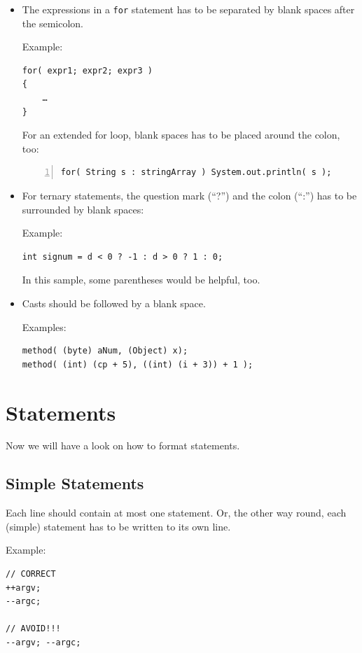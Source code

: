 \documentclass[12pt,a4paper,titlepage, parskip=half, headsepline, footsepline, cleardoubleplain]{scrbook}
\begin{document}
\begin{itemize}
{Example:
\begin{lstlisting}[numbers=left]
a += c + d;
a = (a + b) / (c * d);

while( d-- > s++ )
{
    ++n;
}

printSize( "size is " + foo + "\n" );
\end{lstlisting}}
\item{The expressions in a \lstinline|for| statement has to be separated by blank spaces after the semicolon.

Example:
\begin{lstlisting}
for( expr1; expr2; expr3 )
{
    …
}
\end{lstlisting}

For an extended for loop, blank spaces has to be placed around the colon, too:
\begin{lstlisting}[numbers=left]
for( String s : stringArray ) System.out.println( s );
\end{lstlisting}}
\item{For ternary statements, the question mark (“?”) and the colon (“:”) has to be surrounded by blank spaces:

Example:
\begin{lstlisting}
int signum = d < 0 ? -1 : d > 0 ? 1 : 0;
\end{lstlisting}

In this sample, some parentheses would be helpful, too.}
\item{Casts should be followed by a blank space. 

Examples:
\begin{lstlisting}
method( (byte) aNum, (Object) x);
method( (int) (cp + 5), ((int) (i + 3)) + 1 );
\end{lstlisting}}
\end{itemize}

\section{Statements}
Now we will have a look on how to format statements.

\subsection{Simple Statements}
Each line should contain at most one statement. Or, the other way round, each (simple) statement has to be written to its own line.

Example:
\begin{lstlisting}
// CORRECT
++argv;
--argc;

// AVOID!!!
--argv; --argc;
\end{lstlisting}
\end{document}
